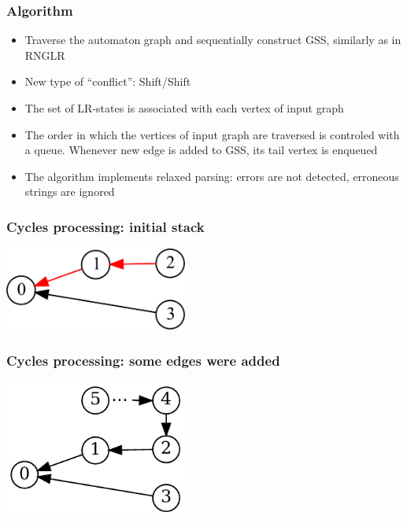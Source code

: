 \documentclass{beamer}
\begin{document}
\begin{frame}
  \transwipe[direction=90]
  \frametitle{Algorithm}
  \begin{itemize}
    \item Traverse the automaton graph and sequentially construct GSS, similarly as in RNGLR
    \item New type of ``conflict'': Shift/Shift
  \end{itemize}
  \begin{itemize}
    \item The set of LR-states is associated with each vertex of input graph
    \item The order in which the vertices of input graph are traversed is 
controled with a queue. Whenever new edge is added to GSS, its tail vertex is enqueued
  \end{itemize}
  \begin{itemize}
    \item The algorithm implements relaxed parsing: errors are not detected, 
erroneous strings are ignored
  \end{itemize}
\end{frame}

\begin{frame}
  \transwipe[direction=90]
  \frametitle{Cycles processing: initial stack}
  \begin{center}                                
  \includegraphics[width=6cm]{pictures/gss_cycle/gss_cycle_init_highlight}
  \end{center}
\end{frame}

\begin{frame}
  \transwipe[direction=90]
  \frametitle{Cycles processing: some edges were added}
  \begin{center}                                
  \includegraphics[width=6cm]{pictures/gss_cycle/gss_cycle_no_square}
  \end{center}
\end{frame}
\end{document}
